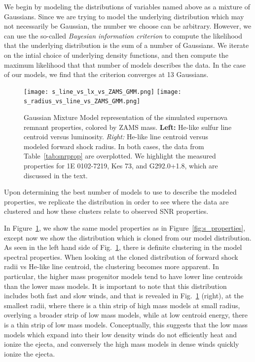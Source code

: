 \documentclass[twocolumn]{aastex631}
\begin{document}
We begin by modeling the distributions of variables named above as a mixture of Gaussians. Since we are trying to model the underlying distribution which may not necessarily be Gaussian, the number we choose can be arbitrary. However, we can use the so-called {\it Bayesian information criterion} \citep{liddle07} to compute the likelihood that the underlying distribution is the sum of a number of Gaussians. We iterate on the intial choice of underlying density functions, and then compute the maximum likelihood that that number of models describes the data. In the case of our models, we find that the criterion converges at 13 Gaussians. 
\begin{figure}
    \centering
    \texttt{[image: s\_line\_vs\_lx\_vs\_ZAMS\_GMM.png]}
    \texttt{[image: s\_radius\_vs\_line\_vs\_ZAMS\_GMM.png]}
    \caption{Gaussian Mixture Model representation of the simulated supernova remnant properties, colored by
    ZAMS mass. {\bf Left:} He-like sulfur line centroid versus luminosity. {\it Right:} He-like line centroid
    versus modeled forward shock radius. In both cases, the data from Table~\ref{tab:snrprop} are overplotted. We highlight the measured properties for 1E 0102-7219, Kes 73, and G292.0+1.8, which are discussed in the text.
    \label{fig:s_prop_gmm}}
\end{figure}
Upon determining the best number of models to use to describe the modeled properties, we replicate the distribution
in order to see where the data are clustered and how these clusters relate to observed SNR properties. 

In Figure~\ref{fig:s_prop_gmm}, we show the same model properties as in Figure~\ref{fig:s_properties}, except now we show the distribution which is cloned from our model distribution. As seen in the left hand side of Fig.~\ref{fig:s_prop_gmm}, there is definite clustering in the model spectral properties. When looking at the cloned 
distribution of forward shock radii vs He-like line centroid, the clustering becomes more apparent. In particular, the higher mass progenitor models tend to have lower line centroids than the lower mass models. It is important to note that this distribution includes both fast and slow winds, and that is revealed in Fig.~\ref{fig:s_prop_gmm} (right), at the smallest radii, where there is a thin strip of high mass models at small radius, overlying 
a broader strip of low mass models, while at low centroid energy, there is a thin strip of low mass models. Conceptually, this suggests that the low mass models which expand into their low density winds do not efficiently heat and ionize the ejecta, and conversely the high mass models in dense winds quickly ionize the ejecta.
\end{document}
